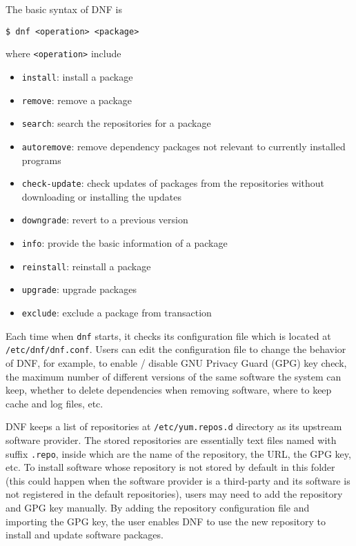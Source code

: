 The basic syntax of DNF is
\begin{lstlisting}
$ dnf <operation> <package>
\end{lstlisting}
where \verb|<operation>| include
\begin{itemize}
	\item \verb|install|: install a package
	\item \verb|remove|: remove a package
	\item \verb|search|: search the repositories for a package
	\item \verb|autoremove|: remove dependency packages not relevant to currently installed programs
	\item \verb|check-update|: check updates of packages from the repositories without downloading or installing the updates
	\item \verb|downgrade|: revert to a previous version
	\item \verb|info|: provide the basic information of a package
	\item \verb|reinstall|: reinstall a package
	\item \verb|upgrade|: upgrade packages
	\item \verb|exclude|: exclude a package from transaction
\end{itemize}

Each time when \verb|dnf| starts, it checks its configuration file which is located at \verb|/etc/dnf/dnf.conf|. Users can edit the configuration file to change the behavior of DNF, for example, to enable / disable GNU Privacy Guard (GPG) key check, the maximum number of different versions of the same software the system can keep, whether to delete dependencies when removing software, where to keep cache and log files, etc.

DNF keeps a list of repositories at \verb|/etc/yum.repos.d| directory as its upstream software provider. The stored repositories are essentially text files named with suffix \verb|.repo|, inside which are the name of the repository, the URL, the GPG key, etc. To install software whose repository is not stored by default in this folder (this could happen when the software provider is a third-party and its software is not registered in the default repositories), users may need to add the repository and GPG key manually. By adding the repository configuration file and importing the GPG key, the user enables DNF to use the new repository to install and update software packages.

